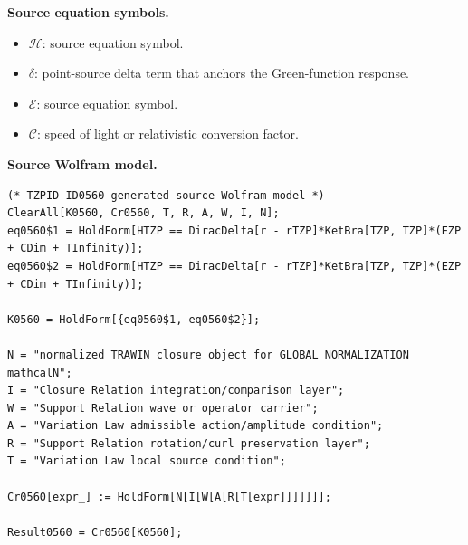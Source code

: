 \begin{minipage}[t]{0.49\linewidth}
\begingroup
\small
\raggedright
\textbf{Source equation symbols.}\par
\begin{itemize}[leftmargin=1.35em,itemsep=1pt,topsep=1pt,parsep=0pt]
    \item $\mathcal{H}$: source equation symbol.
    \item $\delta$: point-source delta term that anchors the Green-function response.
    \item $\mathcal{E}$: source equation symbol.
    \item $\mathcal{C}$: speed of light or relativistic conversion factor.
\end{itemize}
\endgroup
\end{minipage}\hfill
\begin{minipage}[t]{0.47\linewidth}
\begingroup
\scriptsize
\raggedright
\textbf{Source Wolfram model.}\par
\begin{Verbatim}[fontsize=\tiny,breaklines=true,breakanywhere=true]
(* TZPID ID0560 generated source Wolfram model *)
ClearAll[K0560, Cr0560, T, R, A, W, I, N];
eq0560$1 = HoldForm[HTZP == DiracDelta[r - rTZP]*KetBra[TZP, TZP]*(EZP + CDim + TInfinity)];
eq0560$2 = HoldForm[HTZP == DiracDelta[r - rTZP]*KetBra[TZP, TZP]*(EZP + CDim + TInfinity)];

K0560 = HoldForm[{eq0560$1, eq0560$2}];

N = "normalized TRAWIN closure object for GLOBAL NORMALIZATION mathcalN";
I = "Closure Relation integration/comparison layer";
W = "Support Relation wave or operator carrier";
A = "Variation Law admissible action/amplitude condition";
R = "Support Relation rotation/curl preservation layer";
T = "Variation Law local source condition";

Cr0560[expr_] := HoldForm[N[I[W[A[R[T[expr]]]]]]];

Result0560 = Cr0560[K0560];
\end{Verbatim}
\endgroup
\end{minipage}

